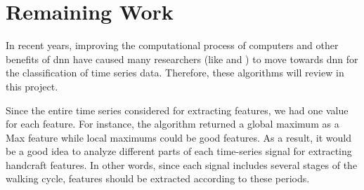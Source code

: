 



%	
 

\section{Remaining Work}

In recent years, improving the computational process of computers and other benefits of \gls{dnn} have caused many researchers (like \cite{IsmailFawaz2019DeepReview} and \cite{Costilla-Reyes2018DeepSensors}) to move towards \gls{dnn} for the classification of time series data. Therefore, these algorithms will review in this project.

Since the entire time series considered for extracting features, we had one value for each feature. For instance, the algorithm returned a global maximum as a Max feature while local maximums could be good features. As a result, it would be a good idea to analyze different parts of each time-series signal for extracting handcraft features. In other words, since each signal includes several stages of the walking cycle, features should be extracted according to these periods.   


